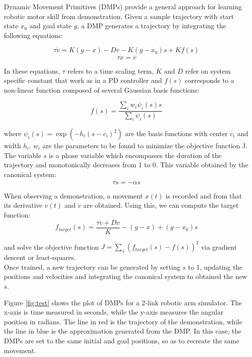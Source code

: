 \documentclass[a4paper]{article}
\begin{document}
\indent \indent Dynamic Movement Primitives (DMPs) provide a general approach for learning robotic motor skill from demonstration. Given a sample trajectory with start state $x_0$ and goal state $g$, a DMP generates a trajectory by integrating the following equations:

$$
\tau \dot{v} = K(g - x) - Dv - K(g - x_0) s + Kf(s)
$$
$$
\tau \dot{x} = v
$$

In these equations, $\tau$ refers to a time scaling term, $K$ and $D$ refer on system specific constant that work as in a PD controller and $f(s)$ corresponds to a non-linear function composed of several Gaussian basis functions:

$$
f(s) = \frac{\sum_i w_i \psi_i(s) s }{\sum_i \psi_i(s)}
$$

where $\psi_i(s) = \exp(-h_i(s-c_i)^2)$ are the basis functions with center $c_i$ and width $h_i$. $w_i$ are the parameters to be found to minimize the objective function J. \\
\indent The variable $s$ is a phase variable which encompasses the duration of the trajectory and monotonically decreases from 1 to 0. This variable obtained by the canonical system:
$$
\tau \dot{s} = -\alpha s
$$
 
When observing a demonstration, a movement $x(t)$ is recorded and from that its derivative $v(t)$ and $\dot{v}$ are obtained. Using this, we can compute the target function:
$$
f_{target}(s) = \frac{\tau \dot{v} + Dv}{K} - (g - x) + (g - x_0) s
$$ 

and solve the objective function $J = \sum_s (f_{target}(s) - f(s))^2$ via gradient descent or least-squares. \\
\indent Once trained, a new trajectory can be generated by setting $s$ to 1, updating the positions and velocities and integrating the canonical system to obtained the new $s$.

Figure \ref{fig:test} shows the plot of DMPs for a 2-link robotic arm simulator. The x-axis is time measured in seconds, while the y-axis measures the angular position in radians. The line in red is the trajectory of the demonstration, while the line in blue is the approximation generated from the DMP. In this case, the DMPs are set to the same initial and goal positions, so as to recreate the same movement.  
 
\end{document}
